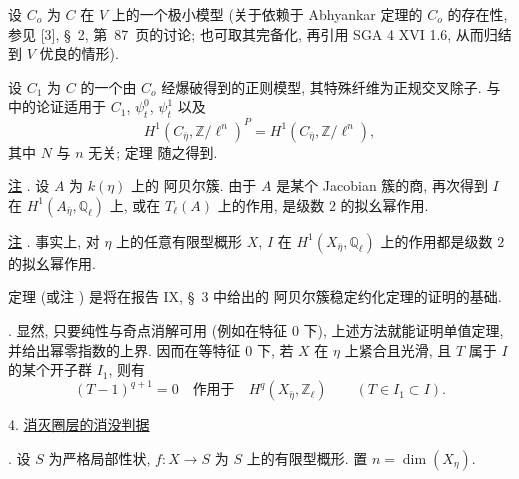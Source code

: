 设 $C_o$ 为 $C$ 在 $V$ 上的一个极小模型 (关于依赖于 Abhyankar 定理的 $C_o$ 的存在性, 参见 [3], \S~2, 第~87~页的讨论; 也可取其完备化, 再引用 SGA 4 XVI 1.6, 从而归结到 $V$ 优良的情形).

设 $C_1$ 为 $C$ 的一个由 $C_o$ 经爆破得到的正则模型, 其特殊纤维为正规交叉除子.  与  中的论证适用于 $C_1$, $\psi_t^0$, $\psi_t^1$ 以及
\[
H^1(C_{\bar\eta},\mathbb Z/\ell^n)^P
=H^1(C_{\bar\eta},\mathbb Z/\ell^n),
\]
其中 $N$ 与 $n$ 无关; 定理  随之得到.

\underline{注} . 设 $A$ 为 $k(\eta)$ 上的 阿贝尔簇. 由于 $A$ 是某个 Jacobian 簇的商, 再次得到 $I$ 在 $H^1(A_{\bar\eta},\mathbb Q_\ell)$ 上, 或在 $T_\ell(A)$ 上的作用, 是级数 $2$ 的拟幺幂作用.

\underline{注} . 事实上, 对 $\eta$ 上的任意有限型概形 $X$, $I$ 在 $H^1(X_{\bar\eta},\mathbb Q_\ell)$ 上的作用都是级数 $2$ 的拟幺幂作用.

定理  (或注 ) 是将在报告 IX, \S~3 中给出的 阿贝尔簇稳定约化定理的证明的基础.

. 显然, 只要纯性与奇点消解可用 (例如在特征 $0$ 下), 上述方法就能证明单值定理, 并给出幂零指数的上界. 因而在等特征 $0$ 下, 若 $X$ 在 $\eta$ 上紧合且光滑, 且 $T$ 属于 $I$ 的某个开子群 $I_1$, 则有
\begin{equation*}
(T-1)^{q+1}=0
\quad\text{作用于}\quad H^q(X_{\bar\eta},\mathbb Z_\ell)
\qquad(T\in I_1\subset I).
\end{equation*}



4. \underline{消灭圈层的消没判据}

. 设 $S$ 为严格局部性状, $f:X\longrightarrow S$ 为 $S$ 上的有限型概形. 置 $n=\dim(X_\eta)$.

